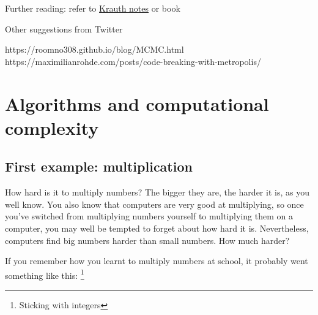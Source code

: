 \documentclass[
  letterpaper,
  DIV=11,
  numbers=noendperiod]{scrreprt}
\theoremstyle{definition}
\theoremstyle{remark}
\begin{document}
Further reading: refer to
\href{https://arxiv.org/pdf/cond-mat/9612186.pdf}{Krauth notes} or book

Other suggestions from Twitter

https://roomno308.github.io/blog/MCMC.html
https://maximilianrohde.com/posts/code-breaking-with-metropolis/


\hypertarget{algorithms-and-computational-complexity}{%
\chapter{Algorithms and computational
complexity}\label{algorithms-and-computational-complexity}}

\hypertarget{first-example-multiplication}{%
\section{First example:
multiplication}\label{first-example-multiplication}}

How hard is it to multiply numbers? The bigger they are, the harder it
is, as you well know. You also know that computers are very good at
multiplying, so once you've switched from multiplying numbers yourself
to multiplying them on a computer, you may well be tempted to forget
about how hard it is. Nevertheless, computers find big numbers harder
than small numbers. How much harder?

If you remember how you learnt to multiply numbers at school, it
probably went something like this: \footnote{Sticking with integers}
\end{document}
